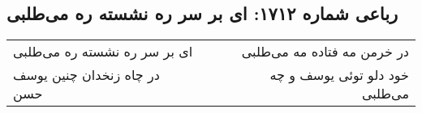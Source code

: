 \begin{center}
\section*{رباعی شماره ۱۷۱۲: ای بر سر ره نشسته ره می‌طلبی}
\label{sec:1712}
\begin{longtable}{l p{0.5cm} r}
ای بر سر ره نشسته ره می‌طلبی
&&
در خرمن مه فتاده مه می‌طلبی
\\
در چاه زنخدان چنین یوسف حسن
&&
خود دلو توئی یوسف و چه می‌طلبی
\\
\end{longtable}
\end{center}
